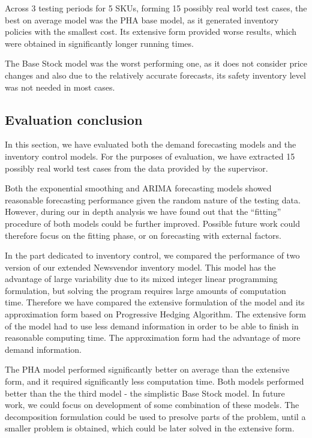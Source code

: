 \documentclass[11pt,a4paper]{article}
\begin{document}
Across 3 testing periods for 5 SKUs, forming 15 possibly real world test cases, the best on average model was the PHA base model, as it generated inventory policies with the smallest cost. Its extensive form provided worse results, which were obtained in significantly longer running times.

The Base Stock model was the worst performing one, as it does not consider price changes and also due to the relatively accurate forecasts, its safety inventory level was not needed in most cases.

\subsection{Evaluation conclusion}
In this section, we have evaluated both the demand forecasting models and the inventory control models. For the purposes of evaluation, we have extracted 15 possibly real world test cases from the data provided by the supervisor. 

Both the exponential smoothing and ARIMA forecasting models showed reasonable forecasting performance given the random nature of the 
testing data. However, during our in depth analysis we have found out that the ``fitting'' procedure of both models could be further improved. Possible future work could therefore focus on the fitting phase, or on forecasting with external factors.

In the part dedicated to inventory control, we compared the performance of two version of our extended Newsvendor inventory model. This model has the advantage of large variability due to its
mixed integer linear programming formulation, but solving the program requires large amounts of computation time. Therefore we have compared  the extensive formulation of the model and its approximation form based on Progressive Hedging Algorithm.
The extensive form of the model had to use less demand information in order to be able to finish in reasonable computing time. The approximation form had the advantage of more demand information. 

The PHA model performed significantly better on average than the extensive form, and it required significantly less computation time.
Both models performed better than the the third model - the simplistic Base Stock model.
In future work, we could focus on development of some combination of these models. The decomposition formulation could be used to presolve parts of the problem, until a smaller problem is obtained, which could be later solved in the extensive form.
\end{document}
